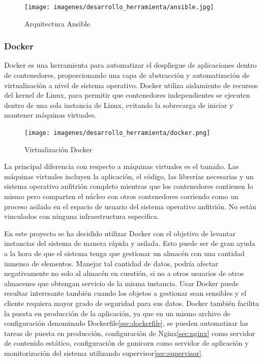 \documentclass[a4paper,11pt]{book}
\begin{document}
\begin{figure}[H] 
\centering 
\texttt{[image: imagenes/desarrollo\_herramienta/ansible.jpg]}
\caption{ Arquitectura Ansible\cite{ans2}}
\end{figure}



\subsubsection{Docker}

Docker\cite{dk} es una herramienta para automatizar el despliegue de aplicaciones dentro de contenedores, proporcionando una capa de abstracción y automatización de virtualización a nivel de sistema operativo. Docker utiliza aislamiento de recursos del kernel de Linux, para permitir que contenedores independientes se ejecuten dentro de una sola instancia de Linux, evitando la sobrecarga de iniciar y mantener máquinas virtuales.

\begin{figure}[H] 
\centering 
\texttt{[image: imagenes/desarrollo\_herramienta/docker.png]}
\caption{ Virtualización Docker\cite{dkw}}
\end{figure}

La principal diferencia con respecto a máquinas virtuales es el tamaño. Las máquinas virtuales incluyen la aplicación, el código, las librerías necesarias y un sistema operativo anfitrión completo mientras que los contenedores contienen lo mismo pero comparten el núcleo con otros contenedores corriendo como un proceso asilado en el espacio de usuario del sistema operativo anfitrión. No están vinculados con ninguna infraestructura especifica. 


En este proyecto se ha decidido utilizar Docker con el objetivo de levantar instancias del sistema de manera rápida y asilada. Esto puede ser de gran ayuda a la hora de que el sistema tenga que gestionar un almacén con una cantidad inmensa de elementos. Manejar tal cantidad de datos, podría afectar negativamente no solo al almacén en cuestión, si no a otros usuarios de otros almacenes que obtengan servicio de la misma instancia. Usar Docker puede resultar interesante también cuando los objetos a gestionar sean sensibles y el cliente requiera mayor grado de seguridad para sus datos. Docker también facilita la puesta en producción de la aplicación, ya que en un mismo archivo de configuración denominado Dockerfile\ref{sec:dockerfile}, se pueden automatizar las tareas de puesta en producción, configuración de Nginx\ref{sec:nginx} como servidor de contenido estático, configuración de gunicorn como servidor de aplicación y monitorización del sistema utilizando supervisor\ref{sec:supervisor}. 
\end{document}
